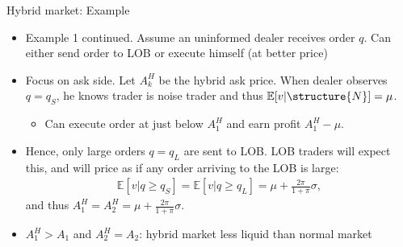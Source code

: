 \documentclass[english,10pt]{beamer}
\begin{document}
\begin{frame}{Hybrid market: Example}
	\begin{itemize}
		\item Example 1 continued. Assume an uninformed dealer receives order $q$. Can either send order to LOB or execute himself (at better price) 
		\item Focus on ask side. Let $A^H_k$ be the hybrid ask price. When dealer observes $q=q_S$, he knows trader is noise trader and thus $\mathbb{E}[v|\structure{N}]=\mu$. 
		\begin{itemize}
			\item Can execute order at just below $A^H_1$ and earn profit $A^H_1-\mu$.
		\end{itemize}
		\item Hence, only large orders $q=q_L$ are sent to LOB. LOB traders will expect this, and will price as if any order arriving to the LOB is large:
		\begin{align*}
		\mathbb{E}[v|q \ge q_S]=\mathbb{E}[v|q \ge q_L]=\mu+\frac{2\pi}{1+\pi} \sigma,
		\end{align*}
		and thus $A^H_1=A^H_2=\mu+\frac{2\pi}{1+\pi} \sigma$.
		\item $A^H_1>A_1$ and $A^H_2=A_2$: hybrid market less liquid than normal market
	\end{itemize}
\end{frame}


\end{document}
